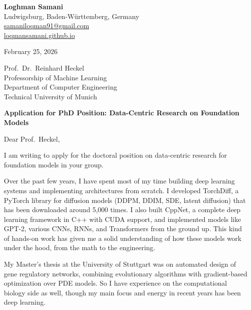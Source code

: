 \documentclass[a4paper,11pt]{article}
\newcommand{\headerfontiii}{\fontfamily{ppl}\selectfont}
\begin{document}
\headerfontiii

\begin{flushleft}
\textbf{Loghman Samani} \\
Ludwigsburg, Baden-W\"urttemberg, Germany \\
\href{mailto:samaniloqman91@gmail.com}{samaniloqman91@gmail.com} \\
\href{https://loqmansamani.github.io}{loqmansamani.github.io}
\end{flushleft}

\vspace{4mm}

\begin{flushleft}
February 25, 2026
\end{flushleft}

\vspace{4mm}

\begin{flushleft}
Prof.\ Dr.\ Reinhard Heckel \\
Professorship of Machine Learning \\
Department of Computer Engineering \\
Technical University of Munich
\end{flushleft}

\vspace{4mm}

\textbf{Application for PhD Position: Data-Centric Research on Foundation Models}

\vspace{4mm}

Dear Prof.\ Heckel,

I am writing to apply for the doctoral position on data-centric research for foundation models in your group.

Over the past few years, I have spent most of my time building deep learning systems and implementing architectures from scratch. I developed TorchDiff, a PyTorch library for diffusion models (DDPM, DDIM, SDE, latent diffusion) that has been downloaded around 5,000 times. I also built CppNet, a complete deep learning framework in C++ with CUDA support, and implemented models like GPT-2, various CNNs, RNNs, and Transformers from the ground up. This kind of hands-on work has given me a solid understanding of how these models work under the hood, from the math to the engineering.

My Master's thesis at the University of Stuttgart was on automated design of gene regulatory networks, combining evolutionary algorithms with gradient-based optimization over PDE models. So I have experience on the computational biology side as well, though my main focus and energy in recent years has been deep learning.
\end{document}
